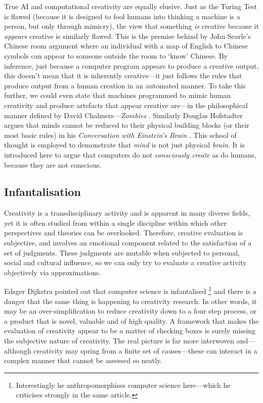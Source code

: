 True \ac{AI} and computational creativity are equally elusive. Just as the Turing Test \autocite{Turing1950} is flawed (because it is designed to fool humans into thinking a machine is a person, but only through mimicry), the view that something \emph{is} creative because it \emph{appears} creative is similarly flawed. This is the premise behind by John Searle's Chinese room argument \citeyear{Searle1980} where an individual with a map of English to Chinese symbols can appear to someone outside the room to `know' Chinese. By inference, just because a computer program appears to produce a creative output, this doesn't mean that it is inherently creative---it just follows the rules that produce output from a human creation in an automated manner. To take this further, we could even state that machines programmed to mimic human creativity and produce artefacts that appear creative are---in the philosophical manner defined by David Chalmers---\emph{Zombies} \citeyear{Chalmers1996}. Similarly Douglas Hofstadter argues that minds cannot be reduced to their physical building blocks (or their most basic rules) in his \textit{Conversation with Einstein's Brain} \citeyear{Hofstadter1981}. This school of thought is employed to demonstrate that \emph{mind} is not just physical \emph{brain}. It is introduced here to argue that computers do not \emph{consciously create} as do humans, because they are not conscious.


\subsection{Infantalisation}
\label{s:babying}

Creativity is a transdisciplinary activity and is apparent in many diverse fields, yet it is often studied from within a single discipline within which other perspectives and theories can be overlooked. Therefore, creative evaluation is subjective, and involves an emotional component related to the satisfaction of a set of judgments. These judgments are mutable when subjected to personal, social and cultural influence, so we can only try to evaluate a creative activity objectively via approximations.

Edsger Dijkstra pointed out that computer science is infantalised \citeyear{Dijkstra1988}\footnote{Interestingly he anthropomorphises computer science here---which he criticises strongly in the same article.} and there is a danger that the same thing is happening to creativity research. In other words, it may be an over-simplification to reduce creativity down to a four step process, or a product that is novel, valuable and of high quality. A framework that makes the evaluation of creativity appear to be a matter of checking boxes is surely missing the subjective nature of creativity. The real picture is far more interwoven and---although creativity may spring from a finite set of causes---these can interact in a complex manner that cannot be assessed so neatly.


